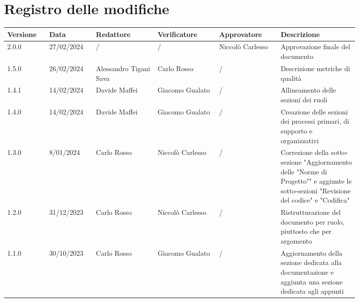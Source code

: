 \section*{Registro delle modifiche}
 {
  \scriptsize
  \begin{tabular}{p{0.10\linewidth}p{0.10\linewidth}p{0.15\linewidth}p{0.15\linewidth}p{0.15\linewidth}p{0.19\linewidth}}
	  \textbf{Versione} & \textbf{Data} & \textbf{Redattore}     & \textbf{Verificatore} & \textbf{Approvatore} & \textbf{Descrizione}                                                                                                                     \\
	  \toprule
	  2.0.0             & 27/02/2024    & /                      & /                     & Niccolò Carlesso     & Approvazione finale del documento                                                                                                        \\
	  \hline
	  1.5.0             & 26/02/2024    & Alessandro Tigani Sava & Carlo Rosso           & /                    & Descrizione metriche di qualità                                                                                                          \\
	  \hline
	  1.4.1             & 14/02/2024    & Davide Maffei          & Giacomo Gualato       & /                    & Allineamento delle sezioni dei ruoli                                                                                                     \\
	  \hline
	  1.4.0             & 14/02/2024    & Davide Maffei          & Giacomo Gualato       & /                    & Creazione delle sezioni dei processi primari, di supporto e organizzativi                                                                \\
	  \hline
	  1.3.0             & 8/01/2024     & Carlo Rosso            & Niccolò Carlesso      & /                    & Correzione della sotto-sezione "Aggiornamento delle "Norme di Progetto"" e aggiunte le sotto-sezioni "Revisione del codice" e "Codifica" \\
	  \hline
	  1.2.0             & 31/12/2023    & Carlo Rosso            & Niccolò Carlesso      & /                    & Ristrutturazione del documento per ruolo, piuttosto che per argomento                                                                    \\
	  \hline
	  1.1.0             & 30/10/2023    & Carlo Rosso            & Giacomo Gualato       & /                    & Aggiornamento della sezione dedicata alla documentazione e aggiunta una sezione dedicata agli appunti                                    \\

\end{tabular}}
